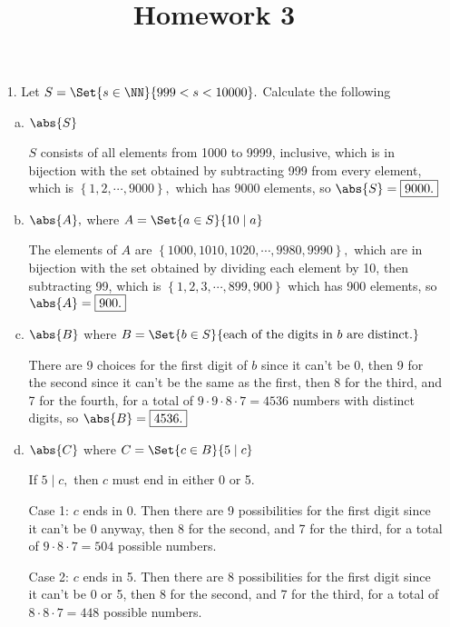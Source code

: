 \documentclass{article}
\begin{document}
\title{Homework 3}
\maketitle
\thispagestyle{fancy}

\begin{itemize}
	\item[1.] Let $S=\Set{s\in \NN}{999<s<10000}.$ Calculate the following
		\begin{enumerate}[(a)]
			\item $\abs{S}$
				\begin{soln}
					$S$ consists of all elements from 1000 to 9999, inclusive, which is in bijection with the set obtained by subtracting 999 from every element, which is $\left\{ 1, 2, \cdots, 9000 \right\},$ which has 9000 elements, so $\abs{S}=\boxed{9000.}$
				\end{soln}

			\item $\abs{A},$ where $A=\Set{a\in S}{10\mid a}$
				\begin{soln}
					The elements of $A$ are $\left\{ 1000, 1010, 1020, \cdots, 9980, 9990 \right\},$ which are in bijection with the set obtained by dividing each element by 10, then subtracting 99, which is $\left\{ 1, 2, 3, \cdots, 899, 900 \right\}$ which has 900 elements, so $\abs{A}=\boxed{900.}$
				\end{soln}

			\item $\abs{B}$ where $B=\Set{b\in S}{\text{each of the digits in } b\text{ are distinct.}}$
				\begin{soln}
					There are 9 choices for the first digit of $b$ since it can't be 0, then 9 for the second since it can't be the same as the first, then 8 for the third, and 7 for the fourth, for a total of $9\cdot9\cdot8\cdot7=4536$ numbers with distinct digits, so $\abs{B}=\boxed{4536.}$
				\end{soln}

			\item $\abs{C}$ where $C=\Set{c\in B}{5\mid c}$
				\begin{soln}
					If $5\mid c,$ then $c$ must end in either 0 or 5.

					Case 1: $c$ ends in 0. Then there are 9 possibilities for the first digit since it can't be 0 anyway, then 8 for the second, and 7 for the third, for a total of $9\cdot8\cdot7=504$ possible numbers.

					Case 2: $c$ ends in 5. Then there are 8 possibilities for the first digit since it can't be 0 or 5, then 8 for the second, and 7 for the third, for a total of $8\cdot8\cdot7=448$ possible numbers.


\end{soln}
\end{enumerate}
\end{itemize}
\end{document}
